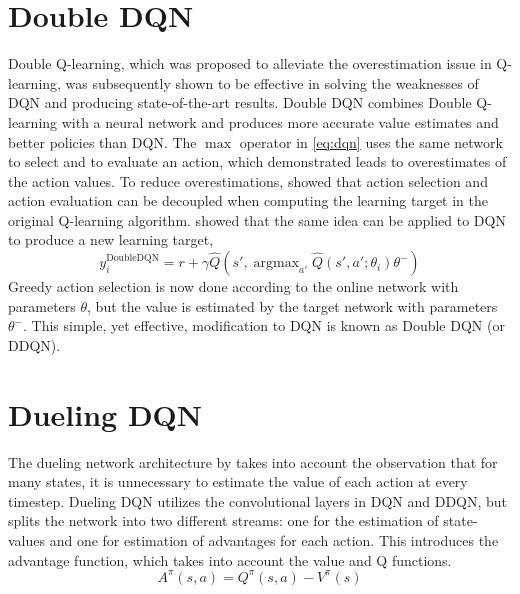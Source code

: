 \documentclass{article}
\DeclareMathOperator*{\argmax}{argmax}
\begin{document}
\section{Double DQN}
Double Q-learning, which was proposed to alleviate the
overestimation issue in Q-learning, was subsequently shown to be effective in
solving the weaknesses of DQN and producing state-of-the-art results. 
Double DQN combines Double Q-learning with a neural network and produces more accurate 
value estimates and better policies than DQN.
The $\max$ operator in \eqref{eq:dqn} uses the same network to select and to
evaluate an action, which \cite{van2016deep} demonstrated leads to
overestimates of the action values. To reduce overestimations,
\cite{hasselt2010double} showed that action selection and action
evaluation can be decoupled when computing the learning target in the original 
Q-learning algorithm. \cite{van2016deep} showed that the same idea can be applied to DQN 
to produce a new learning target,
\begin{equation}
    y_i^{\text{DoubleDQN}} = r + \gamma \hat{Q}(s', \argmax_{a'}
    \hat{Q}(s',a';\theta_i) \theta^-)
\end{equation}
Greedy action selection is now done according to the online network with
parameters $\theta$, but the value is estimated by the target network with
parameters $\theta^-$.  This simple, yet effective, modification to DQN is known
as Double DQN (or DDQN). 



\section{Dueling DQN}
The dueling network architecture by \cite{wang2016dueling} takes into account
the observation that for many states, it is unnecessary to estimate the value of
each action at every timestep. Dueling DQN utilizes the convolutional layers in
DQN and DDQN, but splits the network into two different streams: one for the
estimation of state-values and one for estimation of advantages for each action.
This introduces the advantage function, which takes into account the value and Q
functions.
\begin{equation}
    A^{\pi}(s, a) = Q^{\pi}(s,a) - V^{\pi}(s)
\end{equation}
\end{document}
